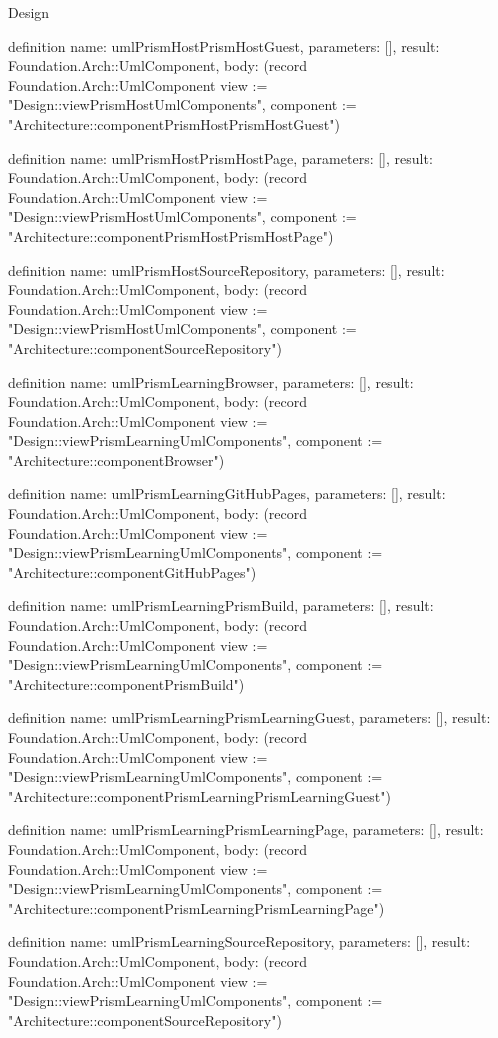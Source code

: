 \begin{lexlean}{Design}
\begin{semanticmodule}
definition{
  name: umlPrismHostPrismHostGuest,
  parameters: [],
  result: Foundation.Arch::UmlComponent,
  body: (record Foundation.Arch::UmlComponent {view := "Design::viewPrismHostUmlComponents", component := "Architecture::componentPrismHostPrismHostGuest"})
}

definition{
  name: umlPrismHostPrismHostPage,
  parameters: [],
  result: Foundation.Arch::UmlComponent,
  body: (record Foundation.Arch::UmlComponent {view := "Design::viewPrismHostUmlComponents", component := "Architecture::componentPrismHostPrismHostPage"})
}

definition{
  name: umlPrismHostSourceRepository,
  parameters: [],
  result: Foundation.Arch::UmlComponent,
  body: (record Foundation.Arch::UmlComponent {view := "Design::viewPrismHostUmlComponents", component := "Architecture::componentSourceRepository"})
}

definition{
  name: umlPrismLearningBrowser,
  parameters: [],
  result: Foundation.Arch::UmlComponent,
  body: (record Foundation.Arch::UmlComponent {view := "Design::viewPrismLearningUmlComponents", component := "Architecture::componentBrowser"})
}

definition{
  name: umlPrismLearningGitHubPages,
  parameters: [],
  result: Foundation.Arch::UmlComponent,
  body: (record Foundation.Arch::UmlComponent {view := "Design::viewPrismLearningUmlComponents", component := "Architecture::componentGitHubPages"})
}

definition{
  name: umlPrismLearningPrismBuild,
  parameters: [],
  result: Foundation.Arch::UmlComponent,
  body: (record Foundation.Arch::UmlComponent {view := "Design::viewPrismLearningUmlComponents", component := "Architecture::componentPrismBuild"})
}

definition{
  name: umlPrismLearningPrismLearningGuest,
  parameters: [],
  result: Foundation.Arch::UmlComponent,
  body: (record Foundation.Arch::UmlComponent {view := "Design::viewPrismLearningUmlComponents", component := "Architecture::componentPrismLearningPrismLearningGuest"})
}

definition{
  name: umlPrismLearningPrismLearningPage,
  parameters: [],
  result: Foundation.Arch::UmlComponent,
  body: (record Foundation.Arch::UmlComponent {view := "Design::viewPrismLearningUmlComponents", component := "Architecture::componentPrismLearningPrismLearningPage"})
}

definition{
  name: umlPrismLearningSourceRepository,
  parameters: [],
  result: Foundation.Arch::UmlComponent,
  body: (record Foundation.Arch::UmlComponent {view := "Design::viewPrismLearningUmlComponents", component := "Architecture::componentSourceRepository"})
}


\end{semanticmodule}
\end{lexlean}
